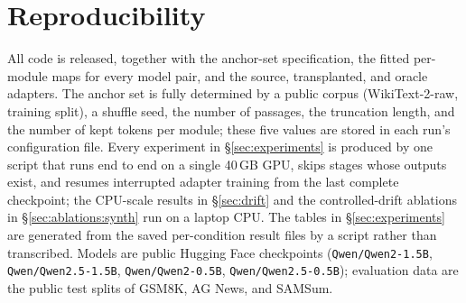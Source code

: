 \section{Reproducibility}
\label{sec:repro}

All code is released, together with the anchor-set specification, the fitted
per-module maps for every model pair, and the source, transplanted, and oracle
adapters. The anchor set is fully determined by a public corpus
(WikiText-2-raw, training split), a shuffle seed, the number of passages, the
truncation length, and the number of kept tokens per module; these five values
are stored in each run's configuration file. Every experiment in
\S\ref{sec:experiments} is produced by one script that runs end to end on a
single 40\,GB GPU, skips stages whose outputs exist, and resumes interrupted
adapter training from the last complete checkpoint; the CPU-scale results in
\S\ref{sec:drift} and the controlled-drift ablations in
\S\ref{sec:ablations:synth} run on a laptop CPU. The tables in
\S\ref{sec:experiments} are generated from the saved per-condition result
files by a script rather than transcribed. Models are public Hugging Face
checkpoints (\texttt{Qwen/Qwen2-1.5B}, \texttt{Qwen/Qwen2.5-1.5B},
\texttt{Qwen/Qwen2-0.5B}, \texttt{Qwen/Qwen2.5-0.5B}); evaluation data are the
public test splits of GSM8K, AG News, and SAMSum.
